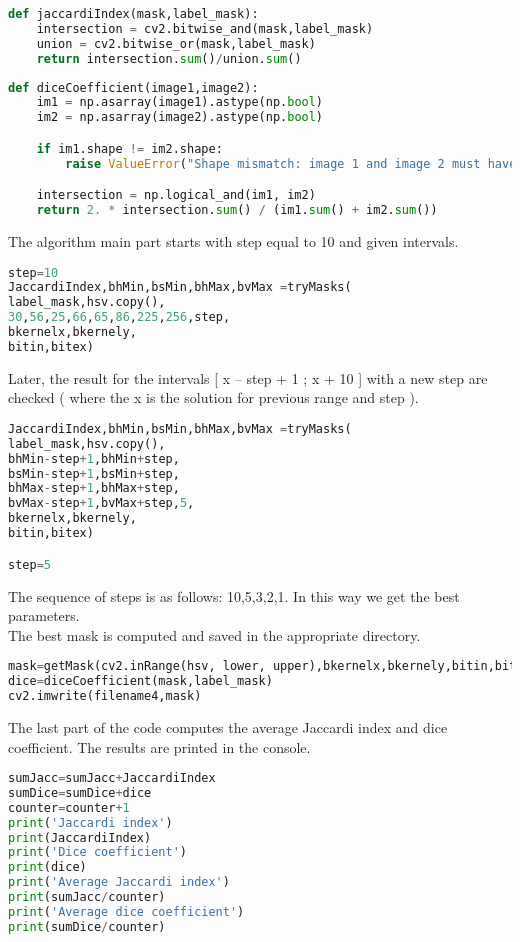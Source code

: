 \documentclass[12pt]{article}
\begin{document}
\begin{lstlisting}[language=Python]
def jaccardiIndex(mask,label_mask):
	intersection = cv2.bitwise_and(mask,label_mask)
	union = cv2.bitwise_or(mask,label_mask)
	return intersection.sum()/union.sum()
\end{lstlisting}
\vspace{5mm}
\begin{lstlisting}[language=Python]
def diceCoefficient(image1,image2):
	im1 = np.asarray(image1).astype(np.bool)
	im2 = np.asarray(image2).astype(np.bool)

	if im1.shape != im2.shape:
		raise ValueError("Shape mismatch: image 1 and image 2 must have the same shape.")

	intersection = np.logical_and(im1, im2)
	return 2. * intersection.sum() / (im1.sum() + im2.sum())
\end{lstlisting}
\vspace{5mm}
The algorithm main part starts with step equal to 10 and given intervals.
\vspace{5mm}
\begin{lstlisting}[language=Python]
step=10
JaccardiIndex,bhMin,bsMin,bhMax,bvMax =tryMasks(
label_mask,hsv.copy(),
30,56,25,66,65,86,225,256,step,
bkernelx,bkernely,
bitin,bitex)
\end{lstlisting}
\vspace{5mm}
Later, the result for the intervals [ x – step + 1 ; x + 10 ] with a new step are checked ( where the x is the solution for previous range and step ).
\vspace{5mm}
\begin{lstlisting}[language=Python]
JaccardiIndex,bhMin,bsMin,bhMax,bvMax =tryMasks(
label_mask,hsv.copy(),
bhMin-step+1,bhMin+step,
bsMin-step+1,bsMin+step,
bhMax-step+1,bhMax+step,
bvMax-step+1,bvMax+step,5,
bkernelx,bkernely,
bitin,bitex)

step=5
\end{lstlisting}
\vspace{5mm}
The sequence of steps is as follows: 10,5,3,2,1. In this way we get the best parameters.\\
The best mask is computed and saved in the appropriate directory.
\vspace{5mm}
\begin{lstlisting}[language=Python]
mask=getMask(cv2.inRange(hsv, lower, upper),bkernelx,bkernely,bitin,bitex)
dice=diceCoefficient(mask,label_mask)
cv2.imwrite(filename4,mask)
\end{lstlisting}
\vspace{5mm}
The last part of the code computes the average Jaccardi index and dice coefficient. The results are printed in the console. 
\vspace{5mm}
\begin{lstlisting}[language=Python]
sumJacc=sumJacc+JaccardiIndex
sumDice=sumDice+dice
counter=counter+1
print('Jaccardi index')
print(JaccardiIndex)
print('Dice coefficient')
print(dice)
print('Average Jaccardi index')
print(sumJacc/counter)
print('Average dice coefficient')
print(sumDice/counter)
\end{lstlisting}
\newpage
\end{document}
